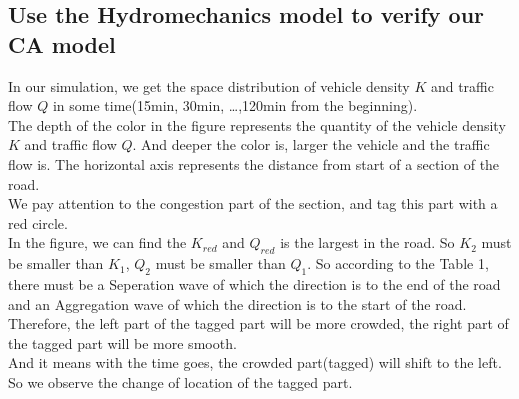 \documentclass{mcmthesis}
\begin{document}
\subsection{Use the Hydromechanics model to verify our CA model}
\indent In our simulation, we get the space distribution of vehicle density $K$ and traffic flow $Q$ in some time(15min, 30min, \ldots ,120min from the beginning).\\
\indent The depth of the color in the figure represents the quantity of the vehicle density $K$ and traffic flow $Q$. And deeper the color is, larger the vehicle and the traffic flow is. The horizontal axis represents the distance from start of a section of the road.\\
\indent We pay attention to the congestion part of the section, and tag this part with a red circle.\\
\indent In the figure, we can find the $K_{red}$ and $Q_{red}$ is the largest in the road. So $K_{2}$ must be smaller than $K_{1}$, $Q_{2}$ must be smaller than $Q_{1}$. So according to the Table 1, there must be a Seperation wave of which the direction is to the end of the road  and an Aggregation wave of which the direction is to the start of the road.\\
\indent Therefore, the left part of the tagged part will be more crowded, the right part of the tagged part will be more smooth.\\
\indent And it means with the time goes, the crowded part(tagged) will shift to the left.\\
\indent So we observe the change of location of the tagged part.\\
\end{document}
